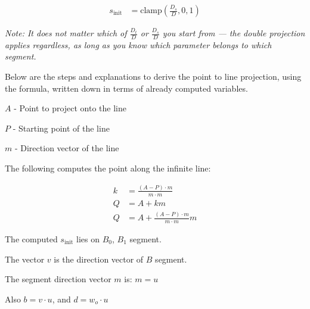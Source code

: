 \documentclass{article}
\begin{document}
\begin{align*}
    s_{\text{init}} &= \text{clamp}(\frac{D_s}{D}, 0, 1)
\end{align*}

\textit{Note: It does not matter which of $\frac{D_t}{D}$ or $\frac{D_s}{D}$ you start
from --- the double projection applies regardless, as long as you know which parameter
belongs to which segment.}

Below are the steps and explanations to derive the point to line projection, using the formula, written down in terms of already computed variables.

$A$ - Point to project onto the line

$P$ - Starting point of the line

$m$ - Direction vector of the line

The following computes the point along the infinite line:

\begin{align*}
    k &= \frac{(A - P) \cdot m}{m \cdot m} \\
    Q &= A + km \\
    Q & = A + \frac{(A - P) \cdot m}{m \cdot m} m
\end{align*}

The computed $s_{\text{init}}$ lies on $B_0$, $B_1$ segment.

The vector $v$ is the direction vector of $B$ segment.

The segment direction vector $m$ is: $m = u$

Also $b = v \cdot u$, and $d = w_o \cdot u$
\end{document}
